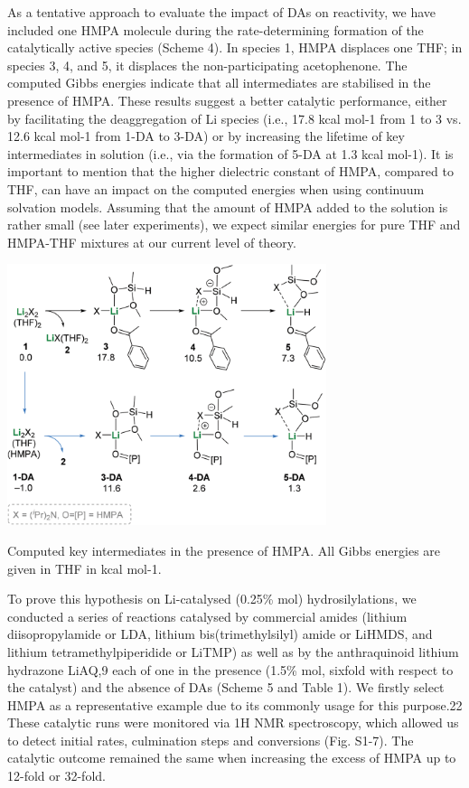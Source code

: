 \documentclass[journal=jacsat,manuscript=article]{achemso}
\begin{document}
	As a tentative approach to evaluate the impact of DAs on	reactivity, we have included one HMPA molecule during the
	rate-determining formation of the catalytically active species (Scheme 4). In species 1, HMPA displaces one THF; in species
	3, 4, and 5, it displaces the non-participating acetophenone. The computed Gibbs energies indicate that all intermediates
	are stabilised in the presence of HMPA. These results suggest a	better catalytic performance, either by facilitating the deaggregation of Li species (i.e., 17.8 kcal mol-1 from 1 to 3 vs. 12.6 kcal mol-1 from 1-DA to 3-DA) or by increasing the lifetime of key intermediates in solution (i.e., via the formation of 5-DA at 1.3 kcal mol-1). It is important to mention that the higher dielectric constant of HMPA, compared to THF, can have an impact on the computed energies when using continuum solvation models. Assuming that the amount of HMPA added to the solution is rather small (see later experiments),
	we expect similar energies for pure THF and HMPA-THF mixtures at our current level of theory.
	
	\begin{scheme}[H]
		\includegraphics[width=0.7\textwidth]{figures/CompHMPA.PNG}		
		\centering
		\caption{Computed key intermediates in the presence of HMPA. All Gibbs energies are given in THF in kcal mol-1.}
		\label{Scheme4}
	\end{scheme}
	
	To prove this hypothesis on Li-catalysed (0.25\% mol) hydrosilylations, we conducted a series of reactions catalysed by
	commercial amides (lithium diisopropylamide or LDA, lithium bis(trimethylsilyl) amide or LiHMDS, and lithium tetramethylpiperidide or LiTMP) as well as by the anthraquinoid lithium	hydrazone LiAQ,9 each of one in the presence (1.5\% mol, sixfold with respect to the catalyst) and the absence of DAs (Scheme 5 and Table 1). We firstly select HMPA as a representative example due to its commonly usage for this purpose.22 These catalytic runs were monitored via 1H NMR spectroscopy, which allowed us to detect initial rates, culmination steps and conversions (Fig. S1-7). The catalytic outcome remained the same when increasing the excess of HMPA up to 12-fold or 32-fold.
	
\end{document}
